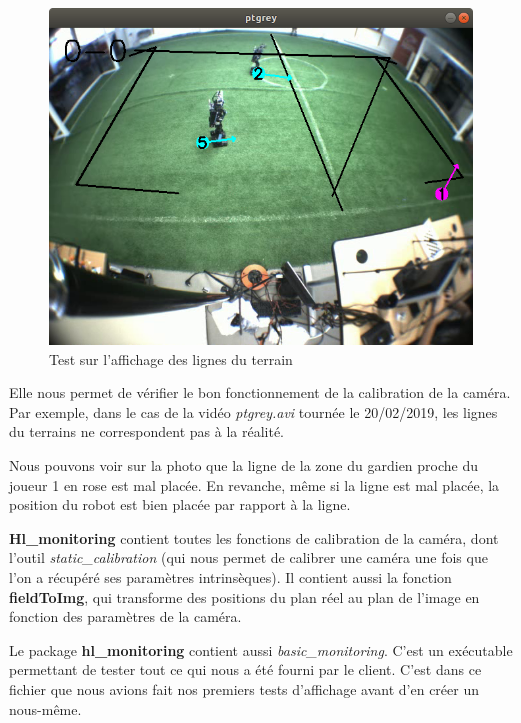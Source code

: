 \begin{figure}[H] 
\centering 
\includegraphics[scale = 0.3]{images/test2.png}
    \caption{Test sur l'affichage des lignes du terrain}
    \label{fig:field}
\end{figure} 

 Elle nous permet de vérifier le bon fonctionnement de la 
 calibration de la caméra. Par exemple, dans le cas de la 
 vidéo \textit{ptgrey.avi} tournée le 20/02/2019, les lignes 
 du terrains ne correspondent pas à la réalité. 
 
 Nous pouvons voir sur la photo que la ligne de la zone du 
 gardien proche du joueur 1 en rose est mal placée. En 
 revanche, même si la ligne est mal placée, la position du 
 robot est bien placée par rapport à la ligne.
\bigskip

\newpage

\textbf{Hl\_monitoring} contient toutes les fonctions de 
calibration de la caméra, dont l'outil 
\textit{static\_calibration} (qui nous permet de calibrer une 
caméra une fois que l'on a récupéré ses paramètres 
intrinsèques). Il contient aussi la fonction 
\textbf{fieldToImg}, qui transforme des positions du plan réel
au plan de l'image en fonction des paramètres de la caméra. 
\bigskip

Le package \textbf{hl\_monitoring} contient aussi
\textit{basic\_monitoring}. C'est un exécutable permettant de 
tester tout ce qui nous a été fourni par le client. C'est dans
ce fichier que nous avions fait nos premiers tests d'affichage
avant d'en créer un nous-même.

